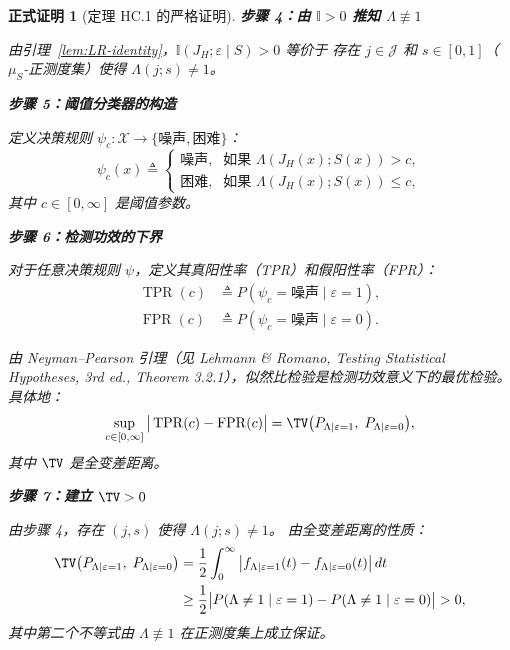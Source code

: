 \documentclass[12pt,a4paper]{article}
\newtheorem{formalproof}[theorem]{正式证明}
\newcommand{\I}{\mathbb{I}}
\newcommand{\cX}{\mathcal{X}}
\newcommand{\cJ}{\mathcal{J}}
\newcommand{\TPR}{\operatorname{TPR}}
\newcommand{\FPR}{\operatorname{FPR}}
\begin{document}
\begin{formalproof}[定理 HC.1 的严格证明]
\textbf{步骤 4：由 $\I > 0$ 推知 $\Lambda \not\equiv 1$}

由引理~\ref{lem:LR-identity}，$\I(J_H; \varepsilon \mid S) > 0$ 等价于
存在 $j \in \cJ$ 和 $s \in [0,1]$（$\mu_S$-正测度集）使得
$\Lambda(j;s) \neq 1$。

\textbf{步骤 5：阈值分类器的构造}

定义决策规则 $\psi_c: \cX \to \{\text{噪声}, \text{困难}\}$：
\begin{equation}\label{eq:threshold-rule}
    \psi_c(x) \triangleq
    \begin{cases}
        \text{噪声}, & \text{如果 } \Lambda(J_H(x); S(x)) > c,\\
        \text{困难}, & \text{如果 } \Lambda(J_H(x); S(x)) \leq c,
    \end{cases}
\end{equation}
其中 $c \in [0, \infty]$ 是阈值参数。

\textbf{步骤 6：检测功效的下界}

对于任意决策规则 $\psi$，定义其真阳性率（TPR）和假阳性率（FPR）：
\begin{align}
    \TPR(c) &\triangleq P(\psi_c = \text{噪声} \mid \varepsilon=1),\\
    \FPR(c) &\triangleq P(\psi_c = \text{噪声} \mid \varepsilon=0).
\end{align}

由 Neyman--Pearson 引理（见 Lehmann \& Romano, Testing Statistical Hypotheses,
3rd ed., Theorem 3.2.1），似然比检验是检测功效意义下的最优检验。
具体地：
\begin{equation}
    \sup_{c \in [0,\infty]} \big| \TPR(c) - \FPR(c) \big|
    = \TV\big( P_{\Lambda \mid \varepsilon=1},\; P_{\Lambda \mid \varepsilon=0} \big),
\end{equation}
其中 $\TV$ 是全变差距离。

\textbf{步骤 7：建立 $\TV > 0$}

由步骤 4，存在 $(j,s)$ 使得 $\Lambda(j;s) \neq 1$。
由全变差距离的性质：
\begin{align}
    \TV\big( P_{\Lambda \mid \varepsilon=1},\; P_{\Lambda \mid \varepsilon=0} \big)
    &= \frac{1}{2} \int_0^{\infty} \big| f_{\Lambda \mid \varepsilon=1}(t) -
        f_{\Lambda \mid \varepsilon=0}(t) \big| \, dt \\
    &\geq \frac{1}{2} \big| P(\Lambda \neq 1 \mid \varepsilon=1) -
        P(\Lambda \neq 1 \mid \varepsilon=0) \big| > 0,
\end{align}
其中第二个不等式由 $\Lambda \not\equiv 1$ 在正测度集上成立保证。


\end{formalproof}
\end{document}
